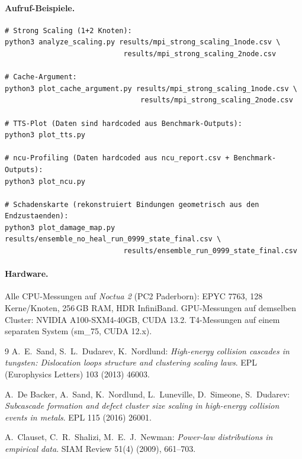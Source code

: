 \documentclass[11pt,a4paper]{article}
\begin{document}

\paragraph{Aufruf-Beispiele.}
\begin{lstlisting}[basicstyle=\ttfamily\footnotesize, breaklines=true]
# Strong Scaling (1+2 Knoten):
python3 analyze_scaling.py results/mpi_strong_scaling_1node.csv \
                            results/mpi_strong_scaling_2node.csv

# Cache-Argument:
python3 plot_cache_argument.py results/mpi_strong_scaling_1node.csv \
                                results/mpi_strong_scaling_2node.csv

# TTS-Plot (Daten sind hardcoded aus Benchmark-Outputs):
python3 plot_tts.py

# ncu-Profiling (Daten hardcoded aus ncu_report.csv + Benchmark-Outputs):
python3 plot_ncu.py

# Schadenskarte (rekonstruiert Bindungen geometrisch aus den Endzustaenden):
python3 plot_damage_map.py results/ensemble_no_heal_run_0999_state_final.csv \
                            results/ensemble_run_0999_state_final.csv
\end{lstlisting}

\paragraph{Hardware.}
Alle CPU-Messungen auf \emph{Noctua 2} (PC2 Paderborn): EPYC 7763,
128 Kerne/Knoten, 256\,GB RAM, HDR InfiniBand. GPU-Messungen auf demselben
Cluster: NVIDIA A100-SXM4-40GB, CUDA 13.2. T4-Messungen auf einem
separaten System (sm\_75, CUDA 12.x).

\begin{thebibliography}{9}
\bibitem{sand2013}
A.~E.~Sand, S.~L.~Dudarev, K.~Nordlund:
\textit{High-energy collision cascades in tungsten: Dislocation loops
structure and clustering scaling laws}.
EPL (Europhysics Letters) 103 (2013) 46003.

\bibitem{debacker2016}
A.~De Backer, A.~Sand, K.~Nordlund, L.~Luneville, D.~Simeone, S.~Dudarev:
\textit{Subcascade formation and defect cluster size scaling in
high-energy collision events in metals}.
EPL 115 (2016) 26001.

A.~Clauset, C.~R.~Shalizi, M.~E.~J.~Newman:
\textit{Power-law distributions in empirical data}.
SIAM Review 51(4) (2009), 661--703.
\end{thebibliography}
\end{document}
